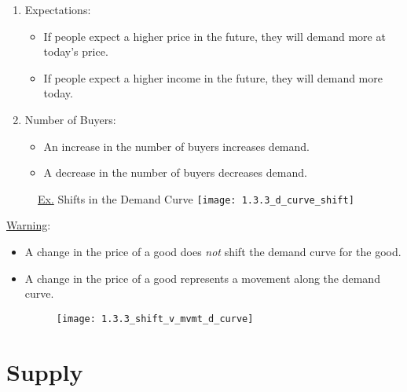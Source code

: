 \begin{enumerate}
\begin{itemize}
		\end{itemize}
		
	\item Expectations:
	
		\begin{itemize}
		
		\item If people expect a higher price in the future, they will demand more at today's price.
		
		\item If people expect a higher income in the future, they will demand more today. 
		
		\end{itemize}
		
	\item Number of Buyers:
	
		\begin{itemize}
		
		\item An increase in the number of buyers increases demand. 
		
		\item A decrease in the number of buyers decreases demand.
		
		\end{itemize}
	
	\end{enumerate}
	
	\begin{figure}[h]
	\underline{Ex.} Shifts in the Demand Curve
	\centering
	\texttt{[image: 1.3.3\_d\_curve\_shift]}
	\end{figure}
	
	\underline{Warning}:
	
	\begin{itemize}
	
	\item A change in the price of a good does \textit{not} shift the demand curve for the good.
	
	\item A change in the price of a good represents a movement along the demand curve.
	
	\begin{figure}[h]
	\centering
	\texttt{[image: 1.3.3\_shift\_v\_mvmt\_d\_curve]}
	\end{figure}
	
	\end{itemize}
	
\section{Supply}


